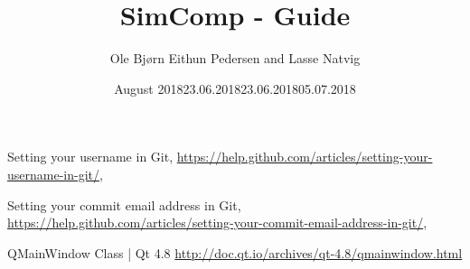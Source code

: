 \documentclass{article}
\title{SimComp - Guide}
\author{Ole Bjørn Eithun Pedersen and Lasse Natvig}
\date{August 2018}
\begin{document}
\maketitle
\tableofcontents
\newpage



\newpage





\begin{thebibliography}{9}
\label{username}
  Setting your username in Git, \url{https://help.github.com/articles/setting-your-username-in-git/}, \date{23.06.2018}
\label{email}
    Setting your commit email address in Git, \url{https://help.github.com/articles/setting-your-commit-email-address-in-git/}, \date{23.06.2018}
\label{qmainwindow}
    QMainWindow Class | Qt 4.8
    \url{http://doc.qt.io/archives/qt-4.8/qmainwindow.html}
    \date{05.07.2018}
\end{thebibliography}
\end{document}
